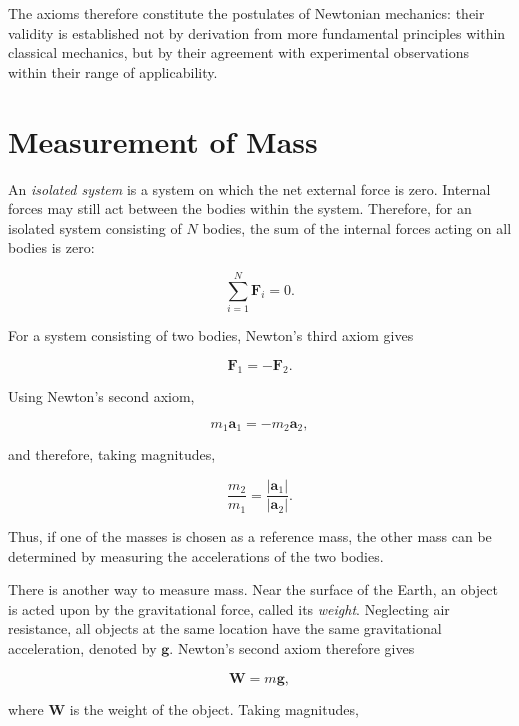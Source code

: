 \documentclass[../main.tex]{subfiles}
\begin{document}
The axioms therefore constitute the postulates of Newtonian mechanics: their validity is established not by derivation from more fundamental principles within classical mechanics, but by their agreement with experimental observations within their range of applicability.


\section{Measurement of Mass}

An \emph{isolated system} is a system on which the net external force is zero. Internal forces may still act between the bodies within the system. Therefore, for an isolated system consisting of $N$ bodies, the sum of the internal forces acting on all bodies is zero:

\begin{equation}
\sum_{i=1}^{N} \mathbf{F}_i = 0.
\end{equation}

For a system consisting of two bodies, Newton's third axiom gives

\begin{equation}
\mathbf{F}_1 = -\mathbf{F}_2.
\end{equation}

Using Newton's second axiom,

\begin{equation}
m_1\mathbf{a}_1 = -m_2\mathbf{a}_2,
\end{equation}

and therefore, taking magnitudes,

\begin{equation}
\frac{m_2}{m_1} = \frac{|\mathbf{a}_1|}{|\mathbf{a}_2|}.
\end{equation}

Thus, if one of the masses is chosen as a reference mass, the other mass can be determined by measuring the accelerations of the two bodies.

There is another way to measure mass. Near the surface of the Earth, an object is acted upon by the gravitational force, called its \emph{weight}. Neglecting air resistance, all objects at the same location have the same gravitational acceleration, denoted by $\mathbf{g}$. Newton's second axiom therefore gives

\begin{equation}
\mathbf{W} = m\mathbf{g},
\end{equation}

where $\mathbf{W}$ is the weight of the object. Taking magnitudes,
\end{document}
